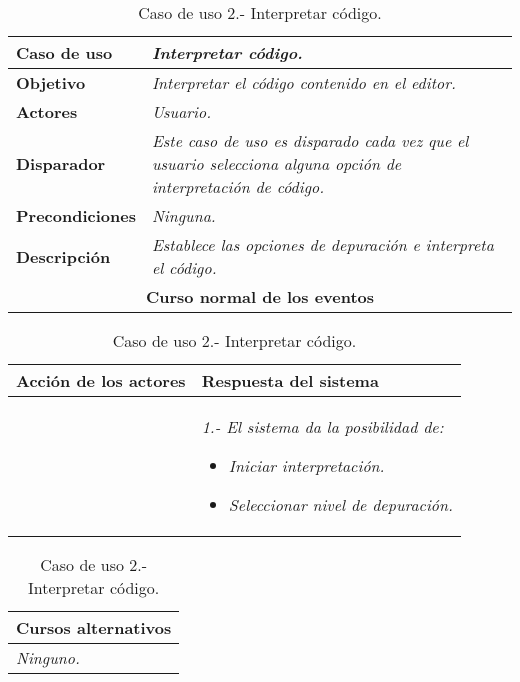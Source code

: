 \documentclass[twoside,a4paper,11pt]{book}
\begin{document}
\begin{table}[!ht]
    \centering
    \begin{tabular}{|p{4cm}|p{11.5cm}|}
    \hline

    \textbf{Caso de uso} & \textit{Interpretar código.}\\
    \hline

    \textbf{Objetivo} & \textit{Interpretar el código contenido en el editor.}\\
    \hline

    \textbf{Actores} & \textit{Usuario.}\\
    \hline

    \textbf{Disparador} & \textit{Este caso de uso es disparado cada vez que el usuario selecciona alguna opción de interpretación de código.}\\
    \hline

    \textbf{Precondiciones} & \textit{Ninguna.}\\
    \hline

    \textbf{Descripción} & \textit{Establece las opciones de depuración e interpreta el código.}\\
    \hline

    \multicolumn{2}{|c|}{\textbf{Curso normal de los eventos}}\\
    \hline

    \end{tabular}
    \begin{tabular}{|p{7.75cm}|p{7.75cm}|}
    \hspace{2cm}\textbf{Acción de los actores} & \hspace{1.75cm}\textbf{Respuesta del sistema}\\
    \hline

    & 
    \textit{1.- El sistema da la posibilidad de:}
   
      \begin{itemize}
	\item \textit{Iniciar interpretación.}
	\item \textit{Seleccionar nivel de depuración.}
      \end{itemize}
    \\
    \hline

    \end{tabular}

    \begin{tabular}{|p{15.9cm}|}
      \hspace{6cm}\textbf{Cursos alternativos}\\
      \hline

    \textit{Ninguno.}\\
    \hline

    \end{tabular}
    \caption{Caso de uso 2.- Interpretar código.}
\end{table}
\end{document}
